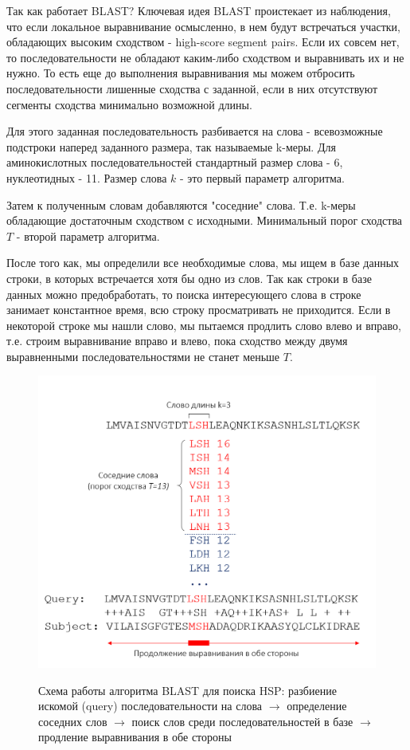 \documentclass[letterpaper, 11pt]{article}
\begin{document}
Так как работает BLAST? Ключевая идея BLAST проистекает из наблюдения, что если локальное выравнивание осмысленно, в нем будут встречаться участки, обладающих высоким сходством - high-score segment pairs. Если их совсем нет, то последовательности не обладают каким-либо сходством и выравнивать их и не нужно. То есть еще до выполнения выравнивания мы можем отбросить последовательности лишенные сходства с заданной, если в них отсутствуют сегменты сходства минимально возможной длины.

Для этого заданная последовательность разбивается на слова - всевозможные подстроки наперед заданного размера, так называемые k-меры. Для аминокислотных последовательностей стандартный размер слова - 6, нуклеотидных - 11. Размер слова $k$ - это первый параметр алгоритма.

Затем к полученным словам добавляются "соседние" слова. Т.е. k-меры обладающие достаточным сходством с исходными. Минимальный порог сходства $T$ - второй параметр алгоритма.

После того как, мы определили все необходимые слова, мы ищем в базе данных строки, в которых встречается хотя бы одно из слов. Так как строки в базе данных можно предобработать, то поиска интересующего слова в строке занимает константное время, всю строку просматривать не приходится. Если в некоторой строке мы нашли слово, мы пытаемся продлить слово влево и вправо, т.е. строим выравнивание вправо и влево, пока сходство между двумя выравненными последовательностями не станет меньше $T$.

\begin{figure}
  \centering
  \includegraphics[width=0.9\linewidth]{images/blast_scheme.png}\\
  \caption{Схема работы алгоритма BLAST для поиска HSP: разбиение искомой (query) последовательности на слова $\rightarrow$ определение соседних слов  $\rightarrow$ поиск слов среди последовательностей в базе  $\rightarrow$ продление выравнивания в обе стороны}\label{fig:third}
\end{figure}
\end{document}
